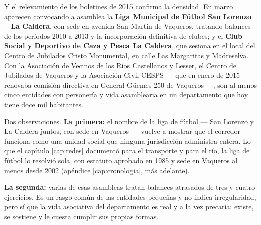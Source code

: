 Y el relevamiento de los boletines de 2015 confirma la densidad. En marzo aparecen convocando a asamblea la \textbf{Liga Municipal de Fútbol San Lorenzo -- La Caldera}, con sede en avenida San Martín de Vaqueros, tratando balances de los períodos 2010 a 2013 y la incorporación definitiva de clubes; y el \textbf{Club Social y Deportivo de Caza y Pesca La Caldera}, que sesiona en el local del Centro de Jubilados Cristo Monumental, en calle Las Margaritas y Madreselva. Con la Asociación de Vecinos de los Ríos Castellanos y Lesser, el Centro de Jubilados de Vaqueros y la Asociación Civil CESPS --- que en enero de 2015 renovaba comisión directiva en General Güemes 250 de Vaqueros ---, son al menos cinco entidades con personería y vida asamblearia en un departamento que hoy tiene doce mil habitantes.

Dos observaciones. \textbf{La primera:} el nombre de la liga de fútbol --- San Lorenzo y La Caldera juntos, con sede en Vaqueros --- vuelve a mostrar que el corredor funciona como una unidad social que ninguna jurisdicción administra entera. Lo que el capítulo \ref{cap:redes} documentó para el transporte y para el río, la liga de fútbol lo resolvió sola, con estatuto aprobado en 1985 y sede en Vaqueros al menos desde 2002 (apéndice \ref{cap:cronologia}, más adelante).

\textbf{La segunda:} varias de esas asambleas tratan balances atrasados de tres y cuatro ejercicios. Es un rasgo común de las entidades pequeñas y no indica irregularidad, pero sí que la vida asociativa del departamento es real y a la vez precaria: existe, se sostiene y le cuesta cumplir sus propias formas.

